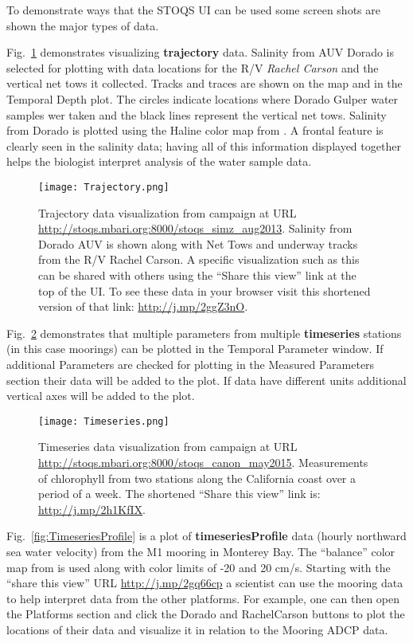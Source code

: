 \documentclass[conference]{IEEEtran}
\begin{document}
To demonstrate ways that the STOQS UI 
can be used some screen shots are shown the major types of data.

Fig.~\ref{fig:Trajectory} demonstrates visualizing \textbf{trajectory} data. Salinity from AUV
Dorado is selected for plotting with data locations for the R/V \textit{Rachel Carson} and the vertical net tows it collected.
Tracks and traces are shown on the map and in the Temporal Depth plot. The circles indicate 
locations where Dorado Gulper water samples wer taken and the black lines represent the vertical net tows.
Salinity from Dorado is plotted using the Haline color map from \cite{cmocean}. A frontal feature is clearly seen in 
the salinity data; having all of this information displayed together helps the biologist 
interpret analysis of the water sample data.

\begin{figure}[htbp]
\centering
\texttt{[image: Trajectory.png]}
\caption{Trajectory data visualization from campaign at URL \url{http://stoqs.mbari.org:8000/stoqs_simz_aug2013}.
Salinity from Dorado AUV is shown along with Net Tows and underway tracks from the R/V Rachel Carson.
A specific visualization such as this can be shared with others using the ``Share this view'' link at the
top of the UI. To see these data in your browser visit this shortened version of that link: \url{http://j.mp/2ggZ3nO}.}
\label{fig:Trajectory}
\end{figure}

Fig.~\ref{fig:Timeseries} demonstrates that multiple parameters from multiple \textbf{timeseries} stations
(in this case moorings) can be plotted in the Temporal Parameter window. If additional Parameters
are checked for plotting in the Measured Parameters section their data will be added to the plot.
If data have different units additional vertical axes will be added to the plot.

\begin{figure}[htbp]
\centering
\texttt{[image: Timeseries.png]}
\caption{Timeseries data visualization from campaign at URL \url{http://stoqs.mbari.org:8000/stoqs_canon_may2015}.
Measurements of chlorophyll from two stations along the California coast over a period of a week.
The shortened ``Share this view'' link is: \url{http://j.mp/2h1KfIX}.}
\label{fig:Timeseries}
\end{figure}

Fig.~\ref{fig:TimeseriesProfile} is a plot of \textbf{timeseriesProfile} data (hourly northward sea water velocity)
from the M1 mooring in Monterey Bay. The ``balance'' color map from \cite{cmocean} is used along with 
color limits of -20 and 20 cm/s. Starting with the ``share this view'' URL \url{http://j.mp/2gq66cp} a scientist
can use the mooring data to help interpret data from the other platforms. For example, one can then open the
Platforms section and click the Dorado and RachelCarson buttons to plot the locations of their data and
visualize it in relation to the Mooring ADCP data.
\end{document}
